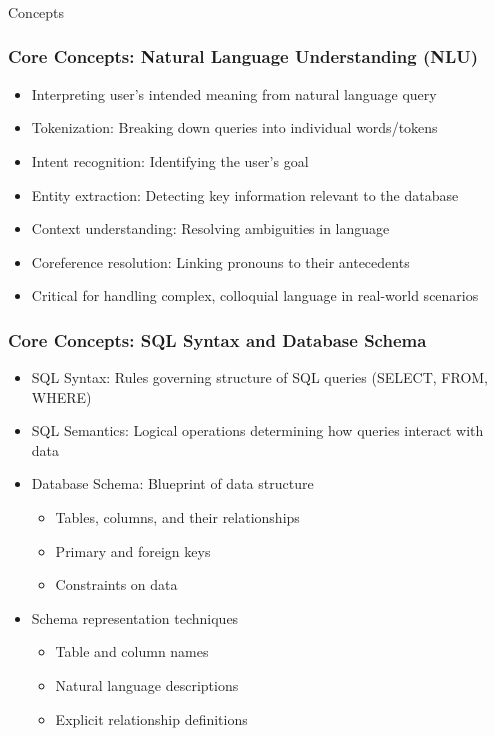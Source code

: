 \begin{frame}[fragile]\frametitle{}
\begin{center}
{\Large Concepts}
\end{center}
\end{frame}

\begin{frame}\frametitle{Core Concepts: Natural Language Understanding (NLU)}
      \begin{itemize}
        \item Interpreting user's intended meaning from natural language query
        \item Tokenization: Breaking down queries into individual words/tokens
        \item Intent recognition: Identifying the user's goal
        \item Entity extraction: Detecting key information relevant to the database
        \item Context understanding: Resolving ambiguities in language
        \item Coreference resolution: Linking pronouns to their antecedents
        \item Critical for handling complex, colloquial language in real-world scenarios
      \end{itemize}
\end{frame}

\begin{frame}\frametitle{Core Concepts: SQL Syntax and Database Schema}
      \begin{itemize}
        \item SQL Syntax: Rules governing structure of SQL queries (SELECT, FROM, WHERE)
        \item SQL Semantics: Logical operations determining how queries interact with data
        \item Database Schema: Blueprint of data structure
          \begin{itemize}
            \item Tables, columns, and their relationships
            \item Primary and foreign keys
            \item Constraints on data
          \end{itemize}
        \item Schema representation techniques
          \begin{itemize}
            \item Table and column names
            \item Natural language descriptions
            \item Explicit relationship definitions
          \end{itemize}
      \end{itemize}
\end{frame}

